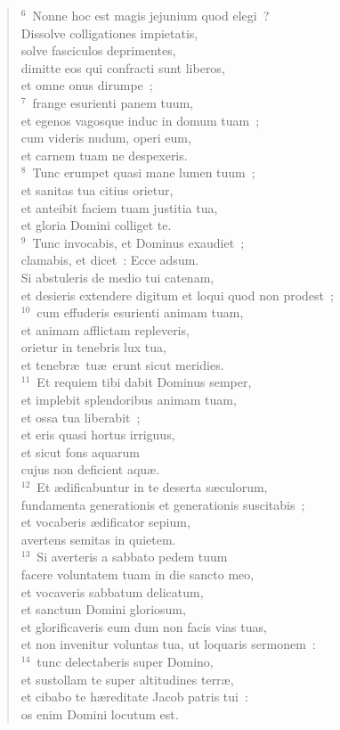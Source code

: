 \begin{verse}${}^{6}$~Nonne hoc est magis jejunium quod elegi~?\\ Dissolve colligationes impietatis,\\ solve fasciculos deprimentes,\\ dimitte eos qui confracti sunt liberos,\\ et omne onus dirumpe~;\\
${}^{7}$~frange esurienti panem tuum,\\ et egenos vagosque induc in domum tuam~;\\ cum videris nudum, operi eum,\\ et carnem tuam ne despexeris.\\
${}^{8}$~Tunc erumpet quasi mane lumen tuum~;\\ et sanitas tua citius orietur,\\ et anteibit faciem tuam justitia tua,\\ et gloria Domini colliget te.\\
${}^{9}$~Tunc invocabis, et Dominus exaudiet~;\\ clamabis, et dicet~: Ecce adsum.\\ Si abstuleris de medio tui catenam,\\ et desieris extendere digitum et loqui quod non prodest~;\\
${}^{10}$~cum effuderis esurienti animam tuam,\\ et animam afflictam repleveris,\\ orietur in tenebris lux tua,\\ et tenebr\ae\ tu\ae\ erunt sicut meridies.\\
${}^{11}$~Et requiem tibi dabit Dominus semper,\\ et implebit splendoribus animam tuam,\\ et ossa tua liberabit~;\\ et eris quasi hortus irriguus,\\ et sicut fons aquarum\\ cujus non deficient aqu\ae .\\
${}^{12}$~Et \ae dificabuntur in te deserta s\ae culorum,\\ fundamenta generationis et generationis suscitabis~;\\ et vocaberis \ae dificator sepium,\\ avertens semitas in quietem.\\
${}^{13}$~Si averteris a sabbato pedem tuum\\ facere voluntatem tuam in die sancto meo,\\ et vocaveris sabbatum delicatum,\\ et sanctum Domini gloriosum,\\ et glorificaveris eum dum non facis vias tuas,\\ et non invenitur voluntas tua, ut loquaris sermonem~:\\
${}^{14}$~tunc delectaberis super Domino,\\ et sustollam te super altitudines terr\ae ,\\ et cibabo te h\ae reditate Jacob patris tui~:\\ os enim Domini locutum est.\end{verse}


